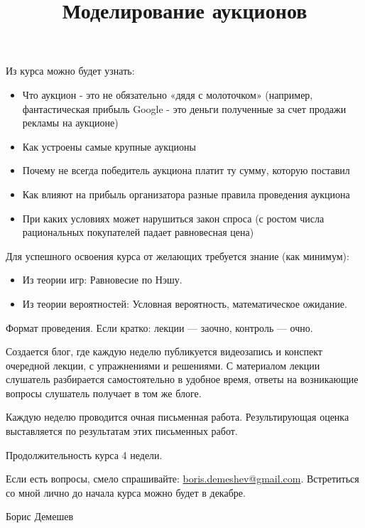 \documentclass[pdftex,12pt,a4paper]{article}
\title{Моделирование аукционов}
\begin{document}
\maketitle




Из курса можно будет узнать:

\begin{itemize}

\item Что аукцион - это не обязательно «дядя с молоточком» (например, фантастическая прибыль Google - это деньги полученные за счет продажи рекламы на аукционе)

\item  Как устроены самые крупные аукционы

\item Почему не всегда победитель аукциона платит ту сумму, которую поставил

\item Как влияют на прибыль организатора разные правила проведения аукциона

\item При каких условиях может нарушиться закон спроса (с ростом числа рациональных покупателей падает равновесная цена)

\end{itemize}


Для успешного освоения курса от желающих требуется знание (как минимум):

\begin{itemize}
\item Из теории игр: Равновесие по Нэшу.
\item Из теории вероятностей: Условная вероятность, математическое ожидание.
\end{itemize}


Формат проведения. Если кратко: лекции — заочно, контроль — очно.

Создается блог, где каждую неделю публикуется видеозапись и конспект очередной лекции, с упражнениями и решениями. С материалом лекции слушатель разбирается самостоятельно в удобное время, ответы на возникающие вопросы слушатель получает в том же блоге.

Каждую неделю проводится очная письменная работа. Результирующая оценка выставляется по результатам этих письменных работ.

Продолжительность курса 4 недели.


Если есть вопросы, смело спрашивайте: \url{boris.demeshev@gmail.com}. Встретиться со мной лично до начала курса можно будет в декабре.


\vskip 30pt


Борис Демешев








%
\end{document}
